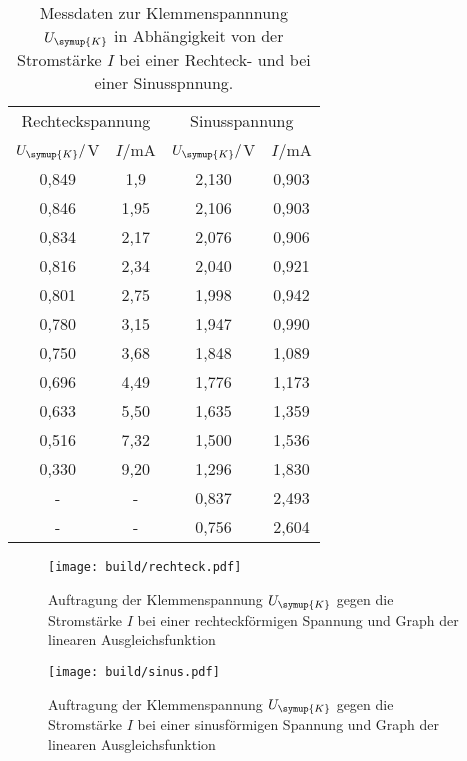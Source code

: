 \begin{table}
  \centering
  \caption{Messdaten zur Klemmenspannnung $U_{\symup{K}}$ in Abhängigkeit von der
  Stromstärke $I$ bei einer Rechteck- und bei einer Sinusspnnung.}
  \label{tab:re_sin}
  \begin{tabular}{c c c c}
    \hline
    \multicolumn{2}{c}{Rechteckspannung} & \multicolumn{2}{c}{Sinusspannung} \\
    \cmidrule(lr){1-2}
    \cmidrule(lr){3-4}
    $U_{\symup{K}}/$V & $I/$mA & $U_{\symup{K}}/$V & $I/$mA \\
    \midrule
    0,849 &	1,9   & 2,130 	& 0,903 \\
    0,846	& 1,95  & 2,106	  & 0,903 \\
    0,834	& 2,17  & 2,076 	& 0,906 \\
    0,816	& 2,34  & 2,040 	& 0,921 \\
    0,801	& 2,75  & 1,998	  & 0,942 \\
    0,780	& 3,15  & 1,947	  & 0,990 \\
    0,750	& 3,68  & 1,848	  & 1,089 \\
    0,696	& 4,49  & 1,776	  & 1,173 \\
    0,633	& 5,50  & 1,635	  & 1,359 \\
    0,516	& 7,32  & 1,500	  & 1,536 \\
    0,330	& 9,20  & 1,296	  & 1,830 \\
    -     & -     & 0,837	  & 2,493 \\
    -     & -     & 0,756	  & 2,604 \\
    \bottomrule
  \end{tabular}
\end{table}

\begin{figure}
  \centering
  \texttt{[image: build/rechteck.pdf]}
  \caption{Auftragung der Klemmenspannung $U_{\symup{K}}$ gegen die Stromstärke $I$
  bei einer rechteckförmigen Spannung und Graph der linearen Ausgleichsfunktion}
  \label{fig:rechteck}
\end{figure}

\begin{figure}
  \centering
  \texttt{[image: build/sinus.pdf]}
  \caption{Auftragung der Klemmenspannung $U_{\symup{K}}$ gegen die Stromstärke $I$
  bei einer sinusförmigen Spannung und Graph der linearen Ausgleichsfunktion}
  \label{fig:sinus}
\end{figure}


